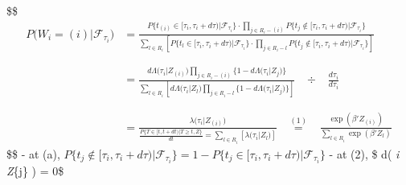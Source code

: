\documentclass[
]{book}
\theoremstyle{definition}
\theoremstyle{definition}
\theoremstyle{definition}
\theoremstyle{definition}
\theoremstyle{remark}
\begin{document}
\$\$
\begin{align}
P \Big ( W_i = (i) \Big | \mathcal F_{\tau_i} \Big)




&=
\frac{


P \Bigg \{ t_{(i)} \in \big[\tau_i , \tau_i + d\tau \big) \Bigg |\mathcal F_{\tau_i} \Bigg \} \cdot 
\prod\limits_{j \in R_i - (i)} P \Bigg \{ t_{j} \not \in \big[\tau_i , \tau_i + d\tau \big) \Bigg |\mathcal F_{\tau_i} \Bigg \} 
}{

\sum\limits_{l \in R_i} 
\left[
P \Bigg \{ t_{l} \in \big[\tau_i , \tau_i + d\tau \big) \Bigg |\mathcal F_{\tau_i} \Bigg \} \cdot 
\prod\limits_{j \in R_i - l} P \Bigg \{ t_{j} \not \in \big[\tau_i , \tau_i + d\tau \big) \Bigg |\mathcal F_{\tau_i} \Bigg \}
\right]
}
\tag{a}





\\
\\
\\


&=
\frac{
d\Lambda \Big( \tau_i \Big | Z_{(i)} \Big)
\prod\limits_{j \in R_i - (i)} \bigg \{ 1 - d\Lambda \Big( \tau_i \Big | Z_{j} \Big) \bigg \}
}{
\sum\limits_{l \in R_i} \left [ d\Lambda \Big( \tau_i \Big | Z_{l} \Big)
\prod\limits_{j \in R_i - l} \bigg \{ 1 - d\Lambda \Big( \tau_i \Big | Z_{j} \Big) \bigg \} \right ]
}


\; \; \; \div \; \; \; \frac{d\tau_i}{d\tau_i}

\tag{2}
\\
\\
\\

&= \frac{\lambda\Big(\tau_i \Big | Z_{(i)} \Big)}{ \frac{P \Big\{T\in [t, t+dt) \Big | T \ge t , Z \Big\}}{dt}= \sum\limits_{l\in R_i} \left[ \lambda\Big(\tau_i \Big | Z_{l} \Big) \right]}

\; \; \; \overset {(1)}{=}  \; \; \; 


\frac{\exp(\beta ' Z_{(i)})}{\sum\limits_{l\in R_i} \exp(\beta ' Z_{l})}





\end{align}
\$\$
- at (a), \(P \Bigg \{ t_{j} \not \in \big[\tau_i , \tau_i + d\tau \big) \Bigg |\mathcal F_{\tau_i} \Bigg \} = 1 - P \Bigg \{ t_{j} \in \big[\tau_i , \tau_i + d\tau \big) \Bigg |\mathcal F_{\tau_i} \Bigg \}\)
- at (2), \$ d\Lambda \Big( \tau\emph{i \Big \textbar{} Z}\{j\} \Big) = 0\$
\end{document}
